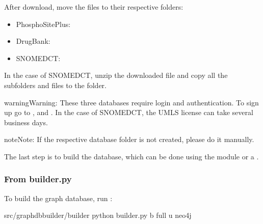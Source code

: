 \documentclass[letterpaper,10pt,english]{sphinxmanual}
\begin{document}
After download, move the files to their respective folders:
\begin{itemize}
\item {} 
PhosphoSitePlus: 

\item {} 
DrugBank: 

\item {} 
SNOMED\sphinxhyphen{}CT: 

\end{itemize}

In the case of SNOMED\sphinxhyphen{}CT, unzip the downloaded file and copy all the subfolders and files to the  folder.

\begin{sphinxadmonition}{warning}{Warning:}
These three databases require login and authentication. To sign up go to ,  and . In the case of SNOMED\sphinxhyphen{}CT, the UMLS license can take several business days.
\end{sphinxadmonition}

\begin{sphinxadmonition}{note}{Note:}
If the respective database folder is not created, please do it manually.
\end{sphinxadmonition}

The last step is to build the database, which can be done using the  module or a .


\subsubsection{From builder.py}
\label{\detokenize{intro/getting-started-with-build:from-builder-py}}
To build the graph database, run :

\begin{sphinxVerbatim}[commandchars=\\\{\}]
\PYGZdl{}  src/graphdb\PYGZus{}builder/builder
\PYGZdl{} python builder.py \PYGZhy{}b full \PYGZhy{}u neo4j
\end{sphinxVerbatim}
\end{document}
